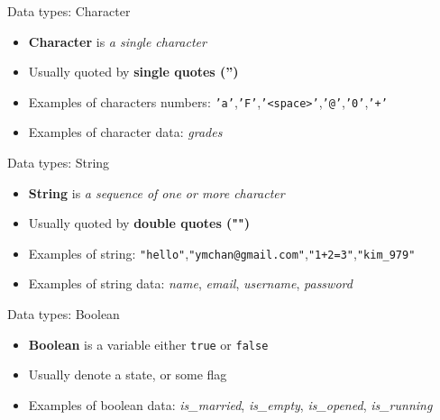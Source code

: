 \documentclass[10pt,xcolor={table,dvipsnames},t]{beamer}
\begin{document}
\begin{frame}{Data types: Character}
  \begin{itemize}
    \item \textbf{Character} is \textit{a single character}
    \item Usually quoted by \textbf{single quotes ('')}
    \item Examples of characters numbers: \texttt{'a'},\texttt{'F'},\texttt{'<space>'},\texttt{'@'},\texttt{'0'},\texttt{'+'}
    \item Examples of character data: \textit{grades}
  \end{itemize}
\end{frame}

\begin{frame}{Data types: String}
  \begin{itemize}
    \item \textbf{String} is \textit{a sequence of one or more character}
    \item Usually quoted by \textbf{double quotes ("")}
    \item Examples of string: \texttt{"hello"},\texttt{"ymchan@gmail.com"},\texttt{"1+2=3"},\texttt{"kim\_979"}
    \item Examples of string data: \textit{name}, \textit{email}, \textit{username}, \textit{password}
  \end{itemize}
\end{frame}

\begin{frame}{Data types: Boolean}
  \begin{itemize}
    \item \textbf{Boolean} is a variable either \texttt{true} or \texttt{false}
    \item Usually denote a state, or some flag
    \item Examples of boolean data: \textit{is\_married}, \textit{is\_empty}, \textit{is\_opened}, \textit{is\_running}
  \end{itemize}
\end{frame}
\end{document}
